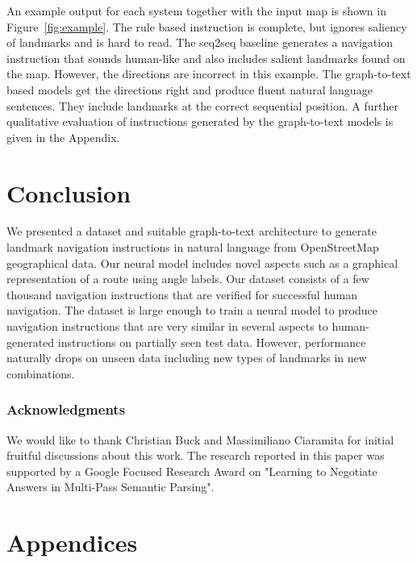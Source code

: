 \documentclass[11pt,a4paper]{article}
\begin{document}
An example output for each system together with the input map is shown in Figure~\ref{fig:example}. The rule based instruction is complete, but ignores saliency of landmarks and is hard to read. The seq2seq baseline generates a navigation instruction that sounds human-like and also includes salient landmarks found on the map. However, the directions are incorrect in this example. The graph-to-text based models get the directions right and produce fluent natural language sentences. They include landmarks at the correct sequential position. A further qualitative evaluation of instructions generated by the graph-to-text models is given in the Appendix.



\section{Conclusion}
We presented a dataset and suitable graph-to-text architecture to generate landmark navigation instructions in natural language from OpenStreetMap geographical data. Our neural model includes novel aspects such as a graphical representation of a route using angle labels. Our dataset consists of a few thousand navigation instructions that are verified for successful human navigation. The dataset is large enough to train a neural model to produce navigation instructions that are very similar in several aspects to human-generated instructions on partially seen test data. However, performance naturally drops on unseen data including new types of landmarks in new combinations.

\subsubsection*{Acknowledgments}
We would like to thank Christian Buck and Massimiliano Ciaramita for initial fruitful discussions about this work.
The research reported in this paper was supported by a Google Focused Research Award on "Learning to Negotiate Answers in Multi-Pass Semantic Parsing". 




\clearpage
\appendix
{}
\section*{Appendices}
\end{document}
